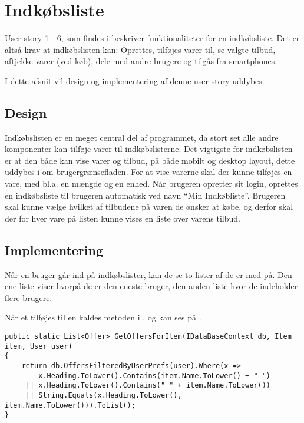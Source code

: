 \section{Indkøbsliste} 
User story 1 - 6, som findes i  beskriver funktionaliteter for en indkøbsliste.
Det er altså krav at indkøbslisten kan: Oprettes, tilføjes varer til, se valgte tilbud, aftjekke varer (ved køb), dele med andre brugere og tilgås fra smartphones.

I dette afsnit vil design og implementering af denne user story uddybes.

\subsection{Design}

Indkøbslisten er en meget central del af programmet, da stort set alle andre komponenter kan tilføje varer til indkøbslisterne.
Det vigtigste for indkøbslisten er at den både kan vise varer og tilbud, på både mobilt og desktop layout, dette uddybes i  om brugergrænsefladen.
For at vise varerne skal der kunne tilføjes en vare, med bl.a. en mængde og en enhed.
Når brugeren opretter sit login, oprettes en indkøbsliste til brugeren automatisk ved navn ``Min Indkøbliste''.
Brugeren skal kunne vælge hvilket af tilbudene på varen de ønsker at købe, og derfor skal der for hver vare på listen kunne vises en liste over varens tilbud.


\subsection{Implementering}

Når en bruger går ind på indkøbslister, kan de se to lister af  de er med på.
Den ene liste viser  hvorpå de er den eneste bruger, den anden liste hvor de indeholder flere brugere.

Når et  tilføjes til en   kaldes metoden  i , og kan ses på .

\begin{lstlisting}[caption={Metoden \class{GetOffersForItem} finder relevante tilbud og returner dem som en liste}, label=getoffersforitem]
public static List<Offer> GetOffersForItem(IDataBaseContext db, Item item, User user)
{
    return db.OffersFilteredByUserPrefs(user).Where(x => 
     	x.Heading.ToLower().Contains(item.Name.ToLower() + " ") 
     || x.Heading.ToLower().Contains(" " + item.Name.ToLower()) 
     || String.Equals(x.Heading.ToLower(), item.Name.ToLower())).ToList();
}
\end{lstlisting}

